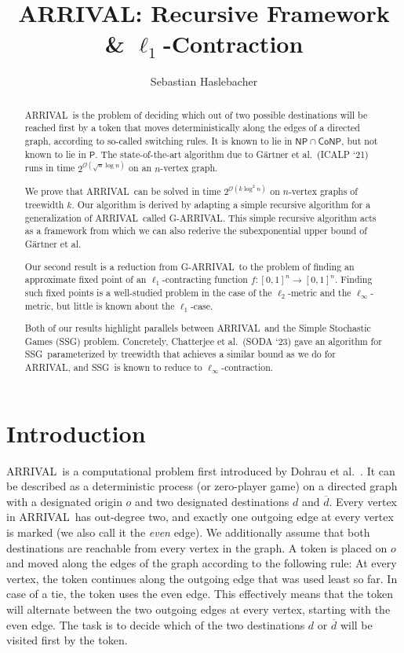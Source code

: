 \documentclass[a4paper,UKenglish,cleveref, autoref, thm-restate]{lipics-v2021}
\title{ARRIVAL: Recursive Framework \texorpdfstring{\&}{and} \texorpdfstring{$\ell_1$}{l1}-Contraction}
\author{Sebastian Haslebacher}{ETH Zurich, Switzerland}{sebastian.haslebacher@inf.ethz.ch}{https://orcid.org/0000-0003-3988-3325}{}
\newcommand{\NP}{\mathsf{NP}}
\newcommand{\CoNP}{\mathsf{CoNP}}
\renewcommand{\P}{\mathsf{P}}
\newcommand{\bigO}{\mathcal{O}}
\newcommand{\problem}[1]{\textrm{#1}}
\newcommand{\arrival}{\problem{ARRIVAL}}
\newcommand{\ssg}{\problem{SSG}}
\newcommand{\garrival}{\problem{G-ARRIVAL}}
\begin{document}
\maketitle

\begin{abstract}
\arrival\ is the problem of deciding which out of two possible destinations will be reached first by a token that moves deterministically along the edges of a directed graph, according to so-called switching rules. It is known to lie in $\NP \cap \CoNP$, but not known to lie in $\P$. The state-of-the-art algorithm due to Gärtner et al.\@~(ICALP `21) runs in time $2^{\bigO(\sqrt{n} \log n)}$ on an $n$-vertex graph.

We prove that \arrival\ can be solved in time $2^{\bigO(k \log^2 n)}$ on $n$-vertex graphs of treewidth $k$. Our algorithm is derived by adapting a simple recursive algorithm for a generalization of \arrival\ called \garrival. This simple recursive algorithm acts as a framework from which we can also rederive the subexponential upper bound of Gärtner et al.

Our second result is a reduction from \garrival\ to the problem of finding an approximate fixed point of an $\ell_1$-contracting function $f : [0, 1]^n \rightarrow [0, 1]^n$. Finding such fixed points is a well-studied problem in the case of the $\ell_2$-metric and the $\ell_\infty$-metric, but little is known about the $\ell_1$-case. 

Both of our results highlight parallels between \arrival\ and the Simple Stochastic Games (\ssg) problem. Concretely, Chatterjee et al.\@~(SODA `23) gave an algorithm for \ssg\ parameterized by treewidth that achieves a similar bound as we do for \arrival, and \ssg\ is known to reduce to $\ell_\infty$-contraction.

\end{abstract}

\section{Introduction}
\label{sec:introduction}

\arrival\ is a computational problem first introduced by Dohrau et al.\@~\cite{dohrauARRIVALZeroPlayerGraph2017}. It can be described as a deterministic process (or zero-player game) on a directed graph with a designated origin $o$ and two designated destinations $d$ and $\overline{d}$. Every vertex in \arrival\ has out-degree two, and exactly one outgoing edge at every vertex is marked (we also call it the \emph{even} edge). We additionally assume that both destinations are reachable from every vertex in the graph. A token is placed on $o$ and moved along the edges of the graph according to the following rule: At every vertex, the token continues along the outgoing edge that was used least so far. In case of a tie, the token uses the even edge. This effectively means that the token will alternate between the two outgoing edges at every vertex, starting with the even edge. The task is to decide which of the two destinations $d$ or $\overline{d}$ will be visited first by the token.
\end{document}

